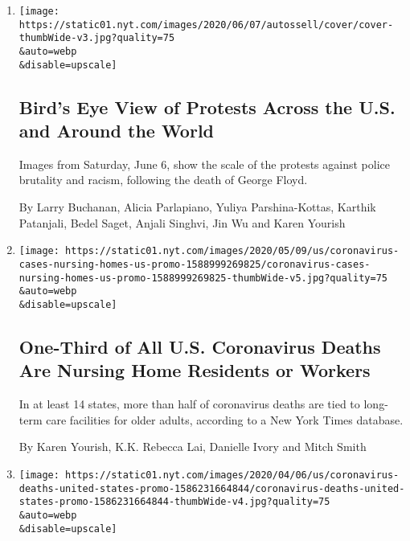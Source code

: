 \begin{enumerate}
\def\labelenumi{\arabic{enumi}.}
\item
  \href{/interactive/2020/06/07/us/george-floyd-protest-aerial-photos.html}{}

  \texttt{[image: https://static01.nyt.com/images/2020/06/07/autossell/cover/cover-thumbWide-v3.jpg?quality=75\\\&auto=webp\\\&disable=upscale]}

  \hypertarget{birds-eye-view-of-protests-across-the-us-and-around-the-world}{%
  \subsection{Bird's Eye View of Protests Across the U.S. and Around the
  World}\label{birds-eye-view-of-protests-across-the-us-and-around-the-world}}

  Images from Saturday, June 6, show the scale of the protests against
  police brutality and racism, following the death of George Floyd.

  By Larry Buchanan, Alicia Parlapiano, Yuliya Parshina-Kottas, Karthik
  Patanjali, Bedel Saget, Anjali Singhvi, Jin Wu and Karen Yourish
\item
  \href{/interactive/2020/05/09/us/coronavirus-cases-nursing-homes-us.html}{}

  \texttt{[image: https://static01.nyt.com/images/2020/05/09/us/coronavirus-cases-nursing-homes-us-promo-1588999269825/coronavirus-cases-nursing-homes-us-promo-1588999269825-thumbWide-v5.jpg?quality=75\\\&auto=webp\\\&disable=upscale]}

  \hypertarget{one-third-of-all-us-coronavirus-deaths-are-nursing-home-residents-or-workers}{%
  \subsection{One-Third of All U.S. Coronavirus Deaths Are Nursing Home
  Residents or
  Workers}\label{one-third-of-all-us-coronavirus-deaths-are-nursing-home-residents-or-workers}}

  In at least 14 states, more than half of coronavirus deaths are tied
  to long-term care facilities for older adults, according to a New York
  Times database.

  By Karen Yourish, K.K. Rebecca Lai, Danielle Ivory and Mitch Smith
\item
  \href{/interactive/2020/04/06/us/coronavirus-deaths-united-states.html}{}

  \texttt{[image: https://static01.nyt.com/images/2020/04/06/us/coronavirus-deaths-united-states-promo-1586231664844/coronavirus-deaths-united-states-promo-1586231664844-thumbWide-v4.jpg?quality=75\\\&auto=webp\\\&disable=upscale]}


\end{enumerate}
